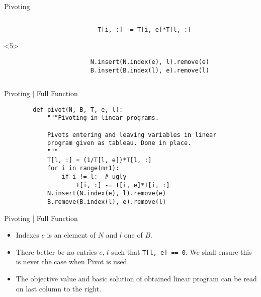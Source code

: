 \documentclass[aspectratio = 169]{beamer}
\begin{document}
\begin{frame}[fragile]{Pivoting}
\begin{columns}
\begin{column}{.5\textwidth}
\begin{overlayarea}{.96\textwidth}{.45\textheight}
\begin{onlyenv}
\begin{tcolorbox}
{\begin{verbatim}
                          T[i, :] -= T[i, e]*T[l, :]
                      \end{verbatim}
                    }
                \end{tcolorbox}
            \end{onlyenv}
            \begin{onlyenv}<5>
                \begin{tcolorbox}[
                    enhanced,
                    parbox = false,
                    colback = mLightBrown!10!white,
                    colframe = mLightBrown,
                    arc = 0mm,
                    ]
                    \small{
                      \begin{verbatim}
                        N.insert(N.index(e), l).remove(e)
                        B.insert(B.index(l), e).remove(l)
                      \end{verbatim}
                    }
            \end{tcolorbox}
            \end{onlyenv}
        \end{overlayarea}
        \end{column}
    \end{columns}
\end{frame}

\begin{frame}[fragile]{Pivoting | Full Function}
     \small{
      \begin{verbatim}
        def pivot(N, B, T, e, l):
            """Pivoting in linear programs.

            Pivots entering and leaving variables in linear
            program given as tableau. Done in place.
            """
            T[l, :] = (1/T[l, e])*T[l, :]
            for i in range(m+1):
                if i != l:  # ugly
                    T[i, :] -= T[i, e]*T[i, :]
            N.insert(N.index(e), l).remove(e)
            B.remove(B.index(l), e).remove(l)
      \end{verbatim}
    }
\end{frame}

\begin{frame}{Pivoting | Full Function}
  \begin{itemize}
  \item<1->
    Indexes $e$ is an element of $N$ and $l$ one of $B$.
  \item<2->
    There better be no entries $e$, $l$ such that
    \texttt{T[l, e] == 0}. We shall ensure this is never
    the case when Pivot is used.
  \item<3->
    The objective value and basic solution of obtained linear program
    can be read on last column to the right.
  \end{itemize}
\end{frame}
\end{document}
